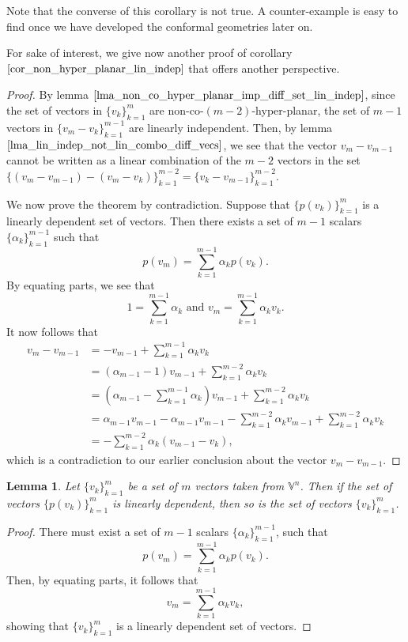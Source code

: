 \documentclass{article}
\newcommand{\V}{\mathbb{V}}
\newtheorem{lemma}{Lemma}[section]
\begin{document}
Note that the converse of this corollary is not true.  A counter-example is easy to find once we
have developed the conformal geometries later on.

For sake of interest, we give now another proof of corollary $\eqref{cor_non_hyper_planar_lin_indep}$
that offers another perspective.

\begin{proof}
By lemma $\eqref{lma_non_co_hyper_planar_imp_diff_set_lin_indep}$, since
the set of vectors in $\{v_k\}_{k=1}^m$ are non-co-$(m-2)$-hyper-planar, the set of $m-1$
vectors in $\{v_m-v_k\}_{k=1}^{m-1}$ are linearly independent.  Then, by lemma
$\eqref{lma_lin_indep_not_lin_combo_diff_vecs}$, we see that the vector
$v_m-v_{m-1}$ cannot be written as a linear combination of the $m-2$ vectors in the
set $\{(v_m-v_{m-1})-(v_m-v_k)\}_{k=1}^{m-2}=\{v_k-v_{m-1}\}_{k=1}^{m-2}$.

We now prove the theorem by contradiction.  Suppose that $\{p(v_k)\}_{k=1}^m$
is a linearly dependent set of vectors.  Then there exists a set of
$m-1$ scalars $\{\alpha_k\}_{k=1}^{m-1}$ such that
\begin{equation*}
p(v_m)=\sum_{k=1}^{m-1}\alpha_k p(v_k).
\end{equation*}
By equating parts, we see that
\begin{equation*}
\mbox{$1 = \sum_{k=1}^{m-1}\alpha_k$ and $v_m = \sum_{k=1}^{m-1}\alpha_k v_k$.}
\end{equation*}
It now follows that
\begin{align*}
v_m-v_{m-1} &= -v_{m-1}+\sum_{k=1}^{m-1}\alpha_k v_k \\
 &= (\alpha_{m-1}-1)v_{m-1} + \sum_{k=1}^{m-2}\alpha_k v_k \\
 &= \left(\alpha_{m-1}-\sum_{k=1}^{m-1}\alpha_k\right)v_{m-1} + \sum_{k=1}^{m-2}\alpha_k v_k \\
 &= \alpha_{m-1}v_{m-1} - \alpha_{m-1}v_{m-1} - \sum_{k=1}^{m-2}\alpha_k v_{m-1} + \sum_{k=1}^{m-2}\alpha_k v_k \\
 &= -\sum_{k=1}^{m-2}\alpha_k(v_{m-1}-v_k),
\end{align*}
which is a contradiction to our earlier conclusion about the vector $v_m-v_{m-1}$.
\end{proof}

\begin{lemma}\label{lma_lin_dep_conf_vecs_imp_lin_dep_pos_vec}
Let $\{v_k\}_{k=1}^m$ be a set of $m$ vectors taken from $\V^n$.
Then if the set of vectors $\{p(v_k)\}_{k=1}^m$ is linearly dependent,
then so is the set of vectors $\{v_k\}_{k=1}^m$.
\end{lemma}
\begin{proof}
There must exist a set of $m-1$ scalars $\{\alpha_k\}_{k=1}^{m-1}$, such that
\begin{equation*}
p(v_m) = \sum_{k=1}^{m-1}\alpha_k p(v_k).
\end{equation*}
Then, by equating parts, it follows that
\begin{equation*}
v_m = \sum_{k=1}^{m-1}\alpha_k v_k,
\end{equation*}
showing that $\{v_k\}_{k=1}^m$ is a linearly dependent set of vectors.
\end{proof}
\end{document}
